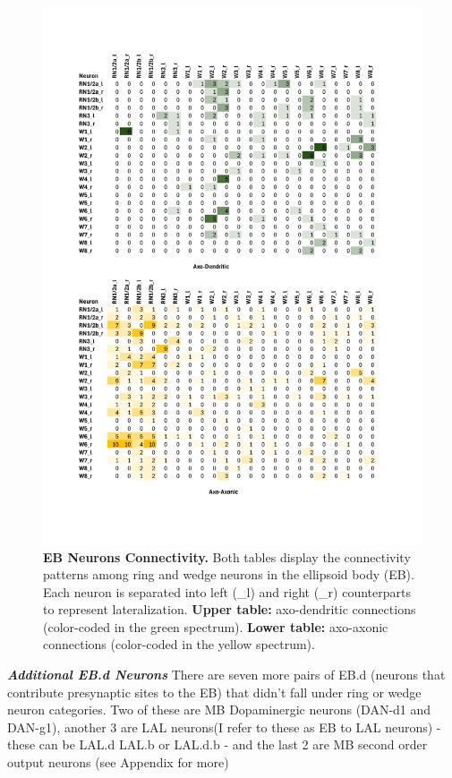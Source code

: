             \begin{figure}[H]
                \centering
                \includegraphics[width=12cm]{Figs/CX/EBneuronsmatrix.pdf}
                \caption{\textbf{EB Neurons Connectivity.} Both tables display the connectivity patterns among ring and wedge neurons in the ellipsoid body (EB). Each neuron is separated into left (\_l) and right (\_r) counterparts to represent lateralization. \textbf{Upper table:} axo-dendritic connections (color-coded in the green spectrum). \textbf{Lower table:} axo-axonic connections (color-coded in the yellow spectrum).}
                \label{EBmatrix}
            \end{figure}

            \textbf{\textit{Additional EB.d Neurons}}
            There are seven more pairs of EB.d (neurons that contribute presynaptic sites to the EB) that didn't fall under ring or wedge neuron categories. Two of these are MB Dopaminergic neurons (DAN-d1 and DAN-g1), another 3 are LAL neurons(I refer to these as EB to LAL neurons) - these can be LAL.d LAL.b or LAL.d.b - and the last 2 are MB second order output neurons (see Appendix for more)%

